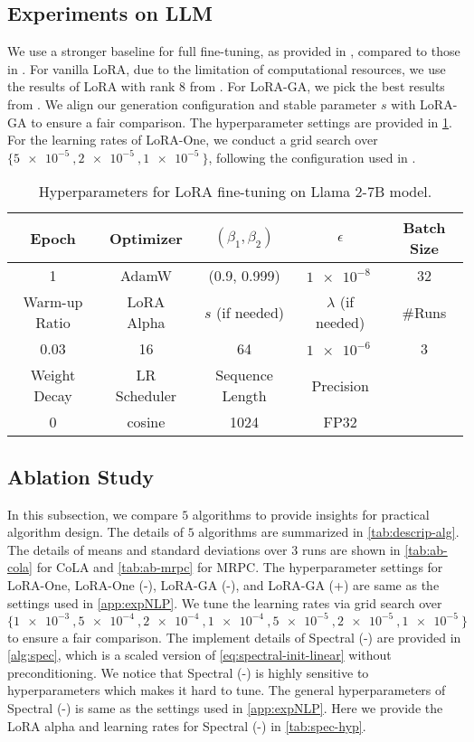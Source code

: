 \subsection{Experiments on LLM}
\label{sec:exp:llm}
We use a stronger baseline for full fine-tuning, as provided in \cite{wang2024lorapro}, compared to those in \cite{wang2024lora}. For vanilla LoRA, due to the limitation of computational resources, we use the results of LoRA with rank $8$ from \cite{wang2024lora}. For LoRA-GA, we pick the best results from \citep{wang2024lora}. We align our generation configuration and stable parameter $s$ with LoRA-GA \cite{wang2024lora} to ensure a fair comparison. The hyperparameter settings are provided in \cref{tab:llama-general}. For the learning rates of LoRA-One, we conduct a grid search over $\{ \SI{5e-5}{} , \SI{2e-5}{} , \SI{1e-5}{} \}$, following the configuration used in \cite{wang2024lora}.

\begin{table}[h]
    \centering
     \caption{Hyperparameters for LoRA fine-tuning on Llama 2-7B model.}
    \label{tab:llama-general}
    \begin{tabular}{ccccc}
        \toprule
        Epoch & Optimizer & $(\beta_1, \beta_2)$ & $\epsilon$ & Batch Size \\
        \midrule
        1 & AdamW & (0.9, 0.999) & $\SI{1e-8}{}$ & 32\\
        \midrule
        Warm-up Ratio & LoRA Alpha & $s$ (if needed) & $\lambda$ (if needed) & \#Runs\\
        \midrule
        0.03 & 16 & 64 & $\SI{1e-6}{}$ & 3 \\
        \midrule
        Weight Decay & LR Scheduler & Sequence Length & Precision & \\
        \midrule
        0 & cosine & 1024 & FP32 & \\
        \bottomrule
    \end{tabular}
\end{table}


\subsection{Ablation Study}
\label{appx:ablation}
In this subsection, we compare $5$ algorithms to provide insights for practical algorithm design. The details of $5$ algorithms are summarized in \cref{tab:descrip-alg}. The details of means and standard deviations over 3 runs are shown in \cref{tab:ab-cola} for CoLA and \cref{tab:ab-mrpc} for MRPC. The hyperparameter settings for LoRA-One, LoRA-One (-), LoRA-GA (-), and LoRA-GA (+) are same as the settings used in \cref{app:expNLP}. We tune the learning rates via grid search over $\{  \SI{1e-3}{}, \SI{5e-4}{}, \SI{2e-4}{},\SI{1e-4}{}, \SI{5e-5}{},\SI{2e-5}{},\SI{1e-5}{} \}$ to ensure a fair comparison. The implement details of Spectral (-) are provided in \cref{alg:spec}, which is a scaled version of \eqref{eq:spectral-init-linear} without preconditioning. We notice that Spectral (-) is highly sensitive to hyperparameters which makes it hard to tune. The general hyperparameters of Spectral (-) is same as the settings used in \cref{app:expNLP}. Here we provide the LoRA alpha and learning rates for Spectral (-) in \cref{tab:spec-hyp}.

